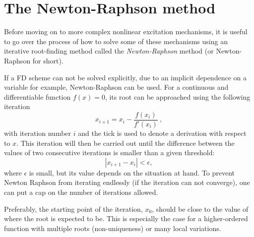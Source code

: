 \section{The Newton-Raphson method}\label{sec:newtonRaphson}
Before moving on to more complex nonlinear excitation mechanisms, it is useful to go over the process of how to solve some of these mechanisms using an iterative root-finding method called the \textit{Newton-Raphson} method (or Newton-Raphson for short). 

If a FD scheme can not be solved explicitly, due to an implicit dependence on a variable for example, Newton-Raphson can be used. For a continuous and differentiable function $f(x) = 0$, its root can be approached using the following iteration
\begin{equation}\label{eq:newtonRaphson}
    x_{i+1} = x_i - \frac{f(x_i)}{f'(x_i)}\ ,
\end{equation}
with iteration number $i$ and the tick is used to denote a derivation with respect to $x$.
This iteration will then be carried out until the difference between the values of two consecutive iterations is smaller than a given threshold:
\begin{equation}\label{eq:NRthreshold}
    |x_{i+1} - x_i| < \epsilon,
\end{equation} 
where $\epsilon$ is small, but its value depends on the situation at hand. To prevent Newton Raphson from iterating endlessly (if the iteration can not converge), one can put a cap on the number of iterations allowed. 

Preferably, the starting point of the iteration, $x_0$, should be close to the value of where the root is expected to be. This is especially the case for a higher-ordered function with multiple roots (non-uniqueness) or many local variations. 

